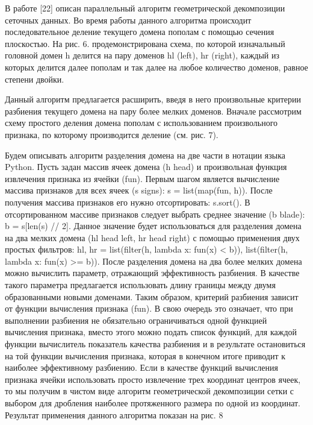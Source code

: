 \documentclass[
11pt,%
tightenlines,%
twoside,%
onecolumn,%
nofloats,%
nobibnotes,%
nofootinbib,%
superscriptaddress,%
noshowpacs,%
centertags]%
{revtex4}
\begin{document}
В работе [22] описан параллельный алгоритм геометрической декомпозиции сеточных данных. Во время работы данного алгоритма происходит последовательное деление текущего домена пополам с помощью сечения плоскостью. На рис. 6. продемонстрирована схема, по которой изначальный головной домен h делится на пару доменов hl (left), hr (right), каждый из которых делится далее пополам и так далее на любое количество доменов, равное степени двойки.

Данный алгоритм предлагается расширить, введя в него произвольные критерии разбиения текущего домена на пару более мелких доменов. Вначале рассмотрим схему простого деления домена пополам с использованием произвольного признака, по которому производится деление (см. рис. 7).

Будем описывать алгоритм разделения домена на две части в нотации языка Python. Пусть задан массив ячеек домена (h  head) и произвольная функция извлечения признака из ячейки (fun). Первым шагом является вычисление массива признаков для всех ячеек (s  signs): s = list(map(fun, h)). После получения массива признаков его нужно отсортировать: s.sort(). В отсортированном массиве признаков следует выбрать среднее значение (b  blade): b = s[len(s) // 2]. Данное значение будет использоваться для разделения домена на два мелких домена (hl  head left, hr  head right) с помощью применения двух простых фильтров: hl, hr = list(filter(h, lambda x: fun(x) < b)), list(filter(h, lambda x: fun(x) >= b)).
После разделения домена на два более мелких домена можно вычислить параметр, отражающий эффективность разбиения. В качестве такого параметра предлагается использовать длину границы между двумя образованными новыми доменами. Таким образом, критерий разбиения зависит от функции вычисления признака (fun). В свою очередь это означает, что при выполнении разбиения не обязательно ограничиваться одной функцией вычисления признака, вместо этого можно подать список функций, для каждой функции вычислитель показатель качества разбиения и в результате остановиться на той функции вычисления признака, которая в конечном итоге приводит к наиболее эффективному разбиению. Если в качестве функций вычисления признака ячейки использовать просто извлечение трех координат центров ячеек, то мы получим в чистом виде алгоритм геометрической декомпозиции сетки с выбором для дробления наиболее протяженного размера по одной из координат. Результат применения данного алгоритма показан на рис. 8
\end{document}
